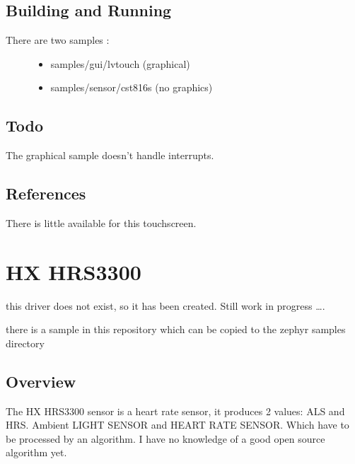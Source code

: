 \documentclass[letterpaper,10pt,english]{sphinxmanual}
\begin{document}
\subsection{Building and Running}
\label{\detokenize{drivers/cst816s:building-and-running}}\begin{description}
\item[{There are two samples :}] \leavevmode\begin{itemize}
\item {} 
samples/gui/lvtouch (graphical)

\item {} 
samples/sensor/cst816s (no graphics)

\end{itemize}

\end{description}


\subsection{Todo}
\label{\detokenize{drivers/cst816s:todo}}
The graphical sample doesn’t handle interrupts.


\subsection{References}
\label{\detokenize{drivers/cst816s:references}}
There is little available for this touchscreen.


\section{HX HRS3300}
\label{\detokenize{drivers/hrs3300:hx-hrs3300}}\label{\detokenize{drivers/hrs3300::doc}}
this driver does not exist, so it has been created.
Still work in progress ….

there is a sample in this repository which can be copied to the zephyr samples directory

\begin{sphinxVerbatim}[commandchars=\\\{\}]
\end{sphinxVerbatim}


\subsection{Overview}
\label{\detokenize{drivers/hrs3300:overview}}
The HX HRS3300 sensor is a heart rate sensor, it produces 2 values: ALS and HRS. Ambient LIGHT SENSOR and HEART RATE SENSOR. Which have to be processed by an algorithm. I have no knowledge of a good open source algorithm yet.
\end{document}
